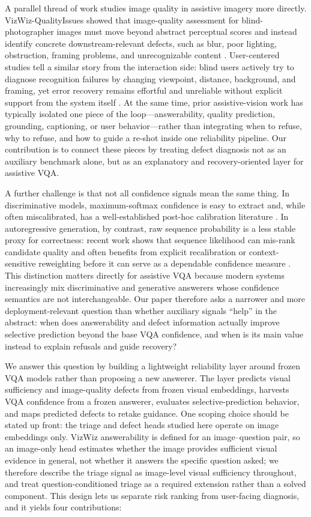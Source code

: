 \documentclass{ieeeaccess}
\begin{document}
A parallel thread of work studies image quality in assistive imagery more directly. VizWiz-QualityIssues showed that image-quality assessment for blind-photographer images must move beyond abstract perceptual scores and instead identify concrete downstream-relevant defects, such as blur, poor lighting, obstruction, framing problems, and unrecognizable content \cite{chiu2020assessing}. User-centered studies tell a similar story from the interaction side: blind users actively try to diagnose recognition failures by changing viewpoint, distance, background, and framing, yet error recovery remains effortful and unreliable without explicit support from the system itself \cite{hong2024blinderrors}. At the same time, prior assistive-vision work has typically isolated one piece of the loop---answerability, quality prediction, grounding, captioning, or user behavior---rather than integrating when to refuse, why to refuse, and how to guide a re-shot inside one reliability pipeline. Our contribution is to connect these pieces by treating defect diagnosis not as an auxiliary benchmark alone, but as an explanatory and recovery-oriented layer for assistive VQA.

A further challenge is that not all confidence signals mean the same thing. In discriminative models, maximum-softmax confidence is easy to extract and, while often miscalibrated, has a well-established post-hoc calibration literature \cite{guo2017calibration}. In autoregressive generation, by contrast, raw sequence probability is a less stable proxy for correctness: recent work shows that sequence likelihood can mis-rank candidate quality and often benefits from explicit recalibration or context-sensitive reweighting before it can serve as a dependable confidence measure \cite{zhao2022slic,lin2024csl}. This distinction matters directly for assistive VQA because modern systems increasingly mix discriminative and generative answerers whose confidence semantics are not interchangeable. Our paper therefore asks a narrower and more deployment-relevant question than whether auxiliary signals ``help'' in the abstract: when does answerability and defect information actually improve selective prediction beyond the base VQA confidence, and when is its main value instead to explain refusals and guide recovery?

We answer this question by building a lightweight reliability layer around frozen VQA models rather than proposing a new answerer. The layer predicts visual sufficiency and image-quality defects from frozen visual embeddings, harvests VQA confidence from a frozen answerer, evaluates selective-prediction behavior, and maps predicted defects to retake guidance. One scoping choice should be stated up front: the triage and defect heads studied here operate on image embeddings only. VizWiz answerability is defined for an image--question pair, so an image-only head estimates whether the image provides sufficient visual evidence in general, not whether it answers the specific question asked; we therefore describe the triage signal as image-level visual sufficiency throughout, and treat question-conditioned triage as a required extension rather than a solved component. This design lets us separate risk ranking from user-facing diagnosis, and it yields four contributions:
\end{document}
